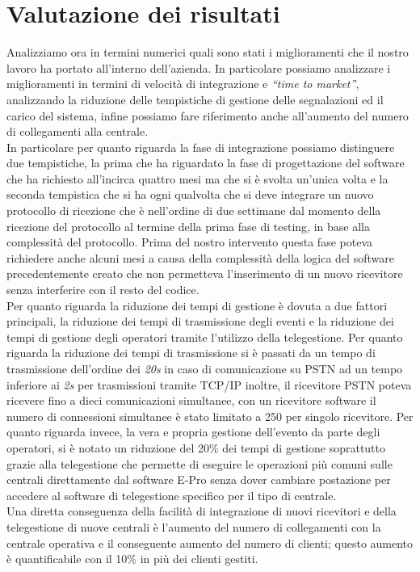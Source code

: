 \section{Valutazione dei risultati}
Analizziamo ora in termini numerici quali sono stati i miglioramenti che il nostro lavoro ha portato all'interno dell'azienda. In particolare possiamo analizzare i miglioramenti in termini di velocità di integrazione e\emph{ “time to market”}, analizzando la riduzione delle tempistiche di gestione delle segnalazioni ed il carico del sistema, infine possiamo fare riferimento anche all'aumento del numero di collegamenti alla centrale.\\
In particolare per quanto riguarda la fase di integrazione possiamo distinguere due tempistiche, la prima che ha riguardato la fase di progettazione del software che ha richiesto all'incirca quattro mesi ma che si è svolta un'unica volta e la seconda tempistica che si ha ogni qualvolta che si deve integrare un nuovo protocollo di ricezione che è nell'ordine di due settimane dal momento della ricezione del protocollo al termine della prima fase di testing, in base alla complessità del protocollo. Prima del nostro intervento questa fase poteva richiedere anche alcuni mesi a causa della complessità della logica del software precedentemente creato che non permetteva l'inserimento di un nuovo ricevitore senza interferire con il resto del codice.\\
Per quanto riguarda la riduzione dei tempi di gestione è dovuta a due fattori principali, la riduzione dei tempi di trasmissione degli eventi e la riduzione dei tempi di gestione degli operatori tramite l'utilizzo della telegestione. Per quanto riguarda la riduzione dei tempi di trasmissione si è passati da un tempo di trasmissione dell'ordine dei \emph{20s} in caso di comunicazione su PSTN ad un tempo inferiore ai \emph{2s} per trasmissioni tramite TCP/IP inoltre, il ricevitore PSTN poteva ricevere fino a dieci comunicazioni simultanee, con un ricevitore software il numero di connessioni simultanee è stato limitato a 250 per singolo ricevitore. Per quanto riguarda invece, la vera e propria gestione dell'evento da parte degli operatori, si è notato un riduzione del 20\% dei tempi di gestione soprattutto grazie alla telegestione che permette di eseguire le operazioni più comuni sulle centrali direttamente dal software E-Pro senza dover cambiare postazione per accedere al software di telegestione specifico per il tipo di centrale.\\
Una diretta conseguenza della facilità di integrazione di nuovi ricevitori e della telegestione di nuove centrali è l'aumento del numero di collegamenti con la centrale operativa e il conseguente aumento del numero di clienti; questo aumento è quantificabile con il 10\% in più dei clienti gestiti.